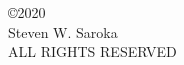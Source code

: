 
\begin{center}
\begin{singlespace}
\copyright 2020\\
Steven W. Saroka\\
ALL RIGHTS RESERVED
\end{singlespace}
\vspace*{52pt}
\end{center}

\clearpage
